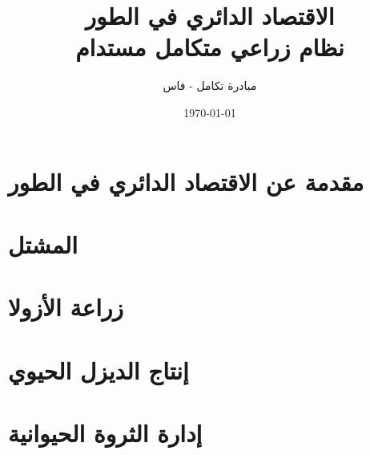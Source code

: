 \documentclass[12pt,a4paper]{report}
\title{الاقتصاد الدائري في الطور\\
\large نظام زراعي متكامل مستدام}
\author{مبادرة تكامل - فاس}
\date{\today}
\begin{document}
\maketitle
\tableofcontents

\chapter{مقدمة عن الاقتصاد الدائري في الطور}

\chapter{المشتل}









\chapter{زراعة الأزولا}









\chapter{إنتاج الديزل الحيوي}









\chapter{إدارة الثروة الحيوانية}








\end{document}
